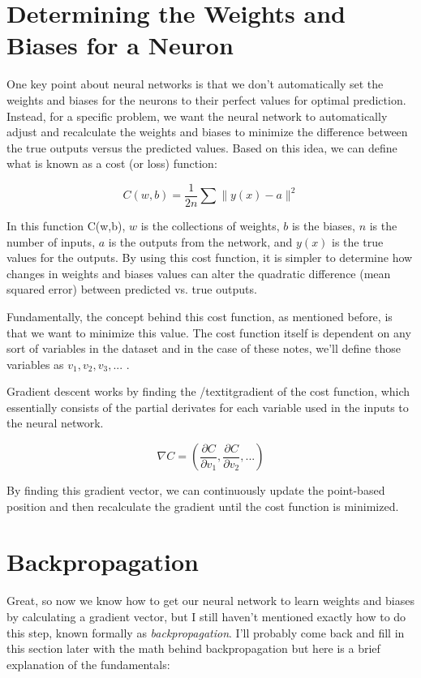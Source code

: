 \documentclass[11pt]{article}
\theoremstyle{definition}
\begin{document}
\section{Determining the Weights and Biases for a Neuron}
One key point about neural networks is that we don't automatically set the weights and biases for the neurons to their perfect values for optimal prediction. Instead, for a specific problem, we want the neural network to automatically adjust and recalculate the weights and biases to minimize the difference between the true outputs versus the predicted values. Based on this idea, we can define what is known as a cost (or loss) function:

$$
C(w,b) = \frac{1}{2n}\sum\parallel y(x)-a\parallel^{2}
$$

In this function C(w,b),  \(w\) is the collections of weights, \(b\) is the biases, \(n\) is the number of inputs, \(a\) is the outputs from the network, and \(y(x)\) is the true values for the outputs. By using this cost function, it is simpler to determine how changes in weights and biases values can alter the quadratic difference (mean squared error) between predicted vs. true outputs.

Fundamentally, the concept behind this cost function, as mentioned before, is that we want to minimize this value. The cost function itself is dependent on any sort of variables in the dataset and in the case of these notes, we'll define those variables as \(v_1, v_2, v_3, ...\) .

Gradient descent works by finding the /textit{gradient} of the cost function, which essentially consists of the partial derivates for each variable used in the inputs to the neural network.

$$
\nabla C = \left (\frac{\partial C}{\partial v_1} , \frac{\partial C}{\partial v_2}, ... \right )
$$

By finding this gradient vector, we can continuously update the point-based position and then recalculate the gradient until the cost function is minimized.

\section{Backpropagation}
Great, so now we know how to get our neural network to learn weights and biases by calculating a gradient vector, but I still haven't mentioned exactly how to do this step, known formally as \textit{backpropagation}. I'll probably come back and fill in this section later with the math behind backpropagation but here is a brief explanation of the fundamentals:
\end{document}
